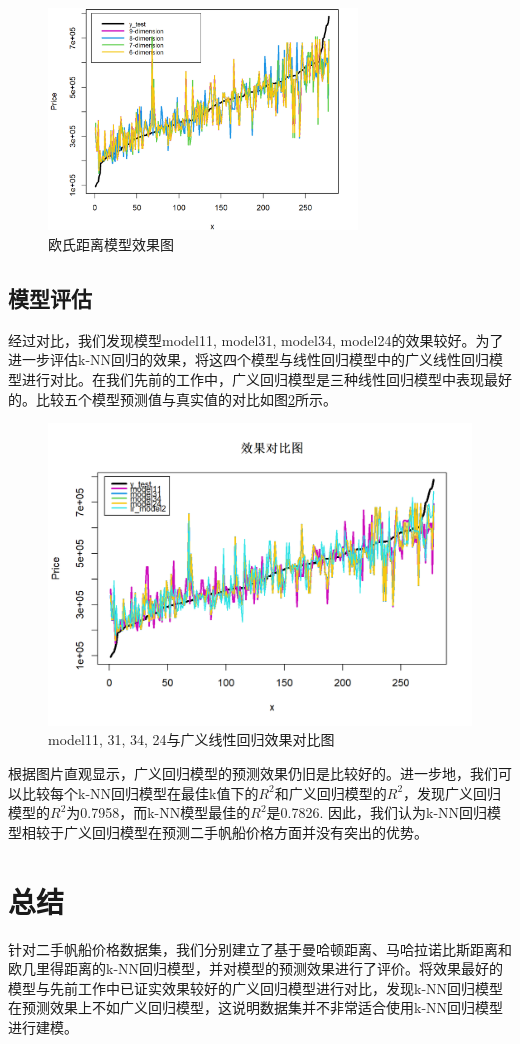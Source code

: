 \documentclass[a4paper,12pt,onecolumn,oneside]{article}
\begin{document}
	\begin{figure}[h]
	\centering
	\includegraphics[width=0.73\textwidth]{res/eucilid.png}
	\caption{欧氏距离模型效果图}
	\label{fig:eucilid}
	\end{figure}
	
	\subsection{模型评估}
	经过对比，我们发现模型model11, model31, model34, model24的效果较好。为了进一步评估k-NN回归的效果，将这四个模型与线性回归模型中的广义线性回归模型进行对比。在我们先前的工作中，广义回归模型是三种线性回归模型中表现最好的。比较五个模型预测值与真实值的对比如图\ref{fig:duibi}所示。\par
	\begin{figure}[h]
	\centering
	\includegraphics[width=\textwidth]{res/duibi.png}
	\caption{model11, 31, 34, 24与广义线性回归效果对比图}
	\label{fig:duibi}
	\end{figure}
	根据图片直观显示，广义回归模型的预测效果仍旧是比较好的。进一步地，我们可以比较每个k-NN回归模型在最佳k值下的$R^2$和广义回归模型的$R^2$，发现广义回归模型的$R^2$为0.7958，而k-NN模型最佳的$R^2$是0.7826. 因此，我们认为k-NN回归模型相较于广义回归模型在预测二手帆船价格方面并没有突出的优势。
	\section{总结}
	针对二手帆船价格数据集，我们分别建立了基于曼哈顿距离、马哈拉诺比斯距离和欧几里得距离的k-NN回归模型，并对模型的预测效果进行了评价。将效果最好的模型与先前工作中已证实效果较好的广义回归模型进行对比，发现k-NN回归模型在预测效果上不如广义回归模型，这说明数据集并不非常适合使用k-NN回归模型进行建模。
\end{document}
